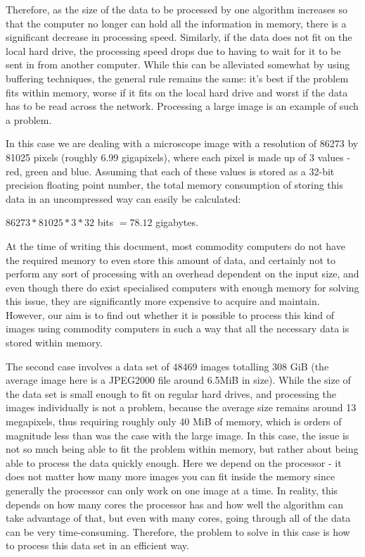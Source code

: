 \documentclass [12pt,a4paper]{report}
\begin{document}
Therefore, as the size of the data to be processed by one algorithm increases so that the computer no longer can hold all the information in memory, there is a significant decrease in processing speed. Similarly, if the data does not fit on the local hard drive, the processing speed drops due to having to wait for it to be sent in from another computer. While this can be alleviated somewhat by using buffering techniques, the general rule remains the same: it's best if the problem fits within memory, worse if it fits on the local hard drive and worst if the data has to be read across the network. Processing a large image is an example of such a problem.

In this case we are dealing with a microscope image with a resolution of 86273 by 81025 pixels (roughly 6.99 gigapixels), where each pixel is made up of 3 values - red, green and blue. Assuming that each of these values is stored as a 32-bit precision floating point number, the total memory consumption of storing this data in an uncompressed way can easily be calculated:

\begin{center}
$ 86273 * 81025 * 3 * 32$ bits $ = 78.12 $ gigabytes.
\end{center}

At the time of writing this document, most commodity computers do not have the required memory to even store this amount of data, and certainly not to perform any sort of processing with an overhead dependent on the input size, and even though there do exist specialised computers with enough memory for solving this issue, they are significantly more expensive to acquire and maintain. However, our aim is to find out whether it is possible  to process this kind of images using commodity computers in such a way that all the necessary data is stored within memory.

The second case involves a data set of 48469 images totalling 308 GiB (the average image here is a JPEG2000 file around 6.5MiB in size). While the size of the data set is small enough to fit on regular hard drives, and processing the images individually is not a problem, because the average size remains around 13 megapixels, thus requiring roughly only 40 MiB of memory, which is orders of magnitude less than was the case with the large image. In this case, the issue is not so much being able to fit the problem within memory, but rather about being able to process the data quickly enough. Here we depend on the processor - it does not matter how many more images you can fit inside the memory since generally the processor can only work on one image at a time. In reality, this depends on how many cores the processor has and how well the algorithm can take advantage of that, but even with many cores, going through all of the data can be very time-consuming. Therefore, the problem to solve in this case is how to process this data set in an efficient way.
\end{document}

